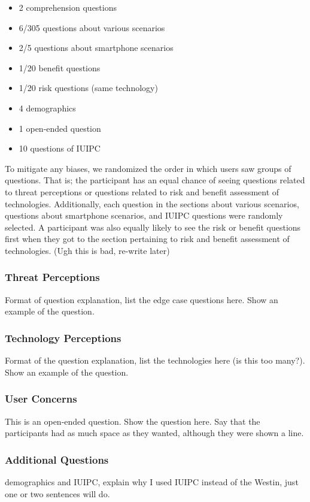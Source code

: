 \documentclass{acm_proc_article-sp}
\begin{document}
\begin{itemize} \itemsep1pt \parskip0pt 
\item 2 comprehension questions 
\item 6/305 questions about various scenarios 
\item 2/5 questions about smartphone scenarios 
\item 1/20 benefit questions 
\item 1/20 risk questions (same technology) 
\item 4 demographics
\item 1 open-ended question 
\item 10 questions of IUIPC \\[-.8cm]
\end{itemize}

To mitigate any biases, we randomized the order in which users saw groups of questions. That is; the participant has an equal chance of seeing questions related to threat perceptions or questions related to risk and benefit assessment of technologies. Additionally, each question in the sections about various scenarios, questions about smartphone scenarios, and IUIPC questions were randomly selected. A participant was also equally likely to see the risk or benefit questions first when they got to the section pertaining to risk and benefit assessment of technologies. (Ugh this is bad, re-write later)

\subsubsection{Threat Perceptions}
Format of question explanation, list the edge case questions here. Show an example of the question. 

\subsubsection{Technology Perceptions}
Format of the question explanation, list the technologies here (is this too many?). Show an example of the question. 

\subsubsection{User Concerns}
This is an open-ended question. Show the question here. Say that the participants had as much space as they wanted, although they were shown a line. 

\subsubsection{Additional Questions}
demographics and IUIPC, explain why I used IUIPC instead of the Westin, just one or two sentences will do. 
\end{document}
